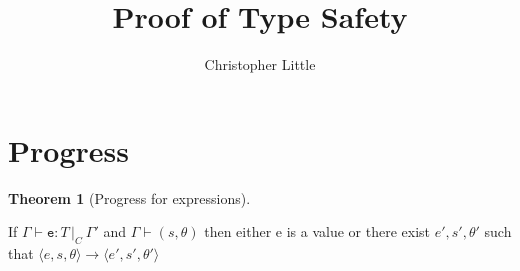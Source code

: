 \documentclass[a4paper]{article}
\theoremstyle{definition}
\theoremstyle{dotless}
\newtheorem{theorem}{Theorem}[section]
\begin{document}
\title{Proof of Type Safety}
\author{Christopher Little}
\maketitle

\section{Progress}
\newcommand{\typable}[2][ ]{\Gamma{}\vdash\mathtt{#2}\, |_C#1\:\Gamma#1'}
\newcommand{\typed}[2]{\Gamma{}\vdash\mathtt{#1}: #2\,|_C\:\Gamma'}
\newcommand{\transition}[6]{\langle{}#1,#2,#3\rangle{}\rightarrow{}\langle{}#4,#5,#6\rangle}
\newcommand{\indHyp}{\Phi(\Gamma, m, C, \Gamma')}
\newcommand{\indHypTwo}{\Psi(\Gamma, e, T, C, \Gamma')}
\newcommand{\var}{\textbf{var}}
\newcommand{\sub}[1]{\textsubscript{#1}}


\begin{theorem}[Progress for expressions]\label{expProgress}

  If $\typed{e}{T}$ and $\Gamma \vdash (s, \theta)$ then either e is a
  value or there exist $e',s', \theta'$ such that $\transition{e}{s}{\theta}{e'}{s'}{\theta'}$

\end{theorem}
\end{document}
